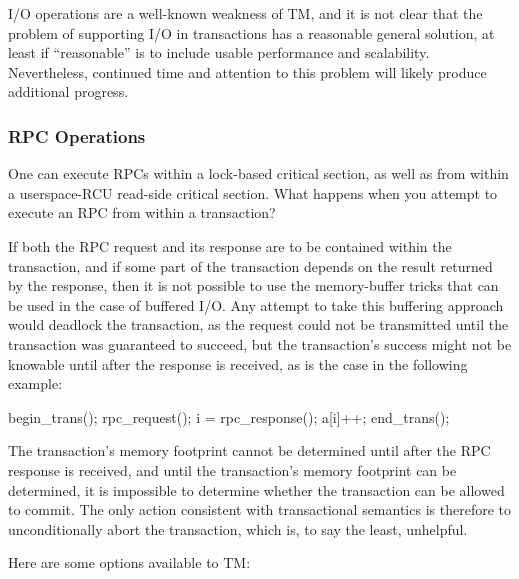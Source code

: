 I/O operations are a well-known weakness of TM, and it is not clear
that the problem of supporting I/O in transactions has a reasonable
general solution, at least if ``reasonable'' is to include usable
performance and scalability.
Nevertheless, continued time and attention to this problem will likely
produce additional progress.

\subsubsection{RPC Operations}
\label{sec:future:RPC Operations}

One can execute RPCs within a lock-based critical section, as well as
from within a userspace-RCU read-side critical section. What happens when you
attempt to execute an RPC from within a transaction?

If both the RPC request and its response are to be contained within the
transaction, and if some part of the transaction depends on the result
returned by the response, then it is not possible to use the memory-buffer
tricks that can be used in the case of buffered I/O.
Any attempt to
take this buffering approach would deadlock the transaction, as the
request could not be transmitted until the transaction was guaranteed
to succeed, but the transaction's success might not be knowable until
after the response is received, as is the case in the following example:

\begin{VerbatimN}
begin_trans();
rpc_request();
i = rpc_response();
a[i]++;
end_trans();
\end{VerbatimN}

The transaction's memory footprint cannot be determined until after the
RPC response is received, and until the transaction's memory footprint
can be determined, it is impossible to determine whether the transaction
can be allowed to commit.
The only action consistent with transactional semantics is therefore to
unconditionally abort the transaction, which is, to say the least,
unhelpful.

Here are some options available to TM:

